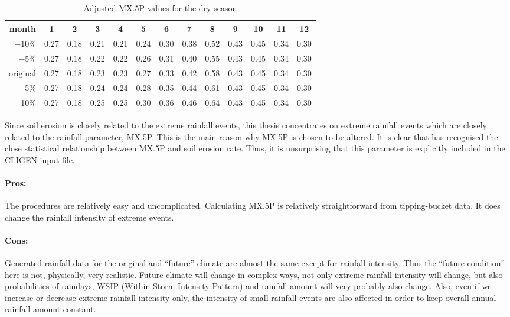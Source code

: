 \begin{table}[htbp]
  \centering
  \footnotesize
  \caption{Adjusted {MX.5P} values for the dry season}
  \label{tab:AdjustedMX5Pvaluesfordryseasons}
    \begin{tabular}{r|cc|cccccc|cccc}
      \toprule
      month & 1 &2& \textbf{3} &\textbf{4} &\textbf{5}& \textbf{6}& \textbf{7}&
\textbf{8}& 9 &10& 11& 12\\
      \midrule
      $-$10\%  &0.27&  0.18  &0.21 & 0.21 & 0.24 & 0.30 & 0.38 & 0.52 & 0.43 &
0.45 & 0.34&  0.30\\
      $-$5\% & 0.27 & 0.18 & 0.22  &0.22  &0.26  &0.31 & 0.40& 0.55 & 0.43 &
0.45 & 0.34 & 0.30\\
      original&  0.27  &0.18 & 0.23  &0.23 & 0.27 & 0.33 &0.42  &0.58 & 0.43&
0.45 & 0.34 & 0.30\\
      5\%  &0.27 & 0.18&  0.24& 0.24 & 0.28 & 0.35 & 0.44 &0.61 & 0.43 & 0.45 &
0.34 & 0.30\\
      10\% & 0.27  &0.18 & 0.25  &0.25  &0.30  &0.36 & 0.46& 0.64 & 0.43 &0.45
&0.34  &0.30 \\
      \bottomrule
    \end{tabular}
\end{table}

Since soil erosion is closely related to the extreme rainfall events, this
thesis concentrates on extreme rainfall events which are closely related to the
rainfall parameter, {MX.5P}. This is the main reason why {MX.5P} is chosen to be
altered. It is clear that \citet{nicks1995-2} has recognised the close
statistical relationship between {MX.5P} and soil erosion rate. Thus, it is
unsurprising that this parameter is explicitly included in the CLIGEN input
file.

\paragraph{Pros:}
\label{sec:ProsMethodTwo}
The procedures are relatively easy and uncomplicated. Calculating {MX.5P} is
relatively straightforward from tipping-bucket data. It does change the rainfall
intensity of extreme events.

\paragraph{Cons:}
\label{sec:ConsMethodTwo}
Generated rainfall data for the original and ``future'' climate are almost the
same except for rainfall intensity. Thus the ``future condition'' here is not,
physically, very realistic. Future climate will change in complex ways, not
only extreme rainfall intensity will change, but also probabilities of raindays,
WSIP (Within-Storm Intensity Pattern) and rainfall amount will very
probably also change.
Also, even if we increase or decrease extreme rainfall intensity only, the
intensity of small rainfall events are also affected in order to keep overall
annual rainfall amount constant.

